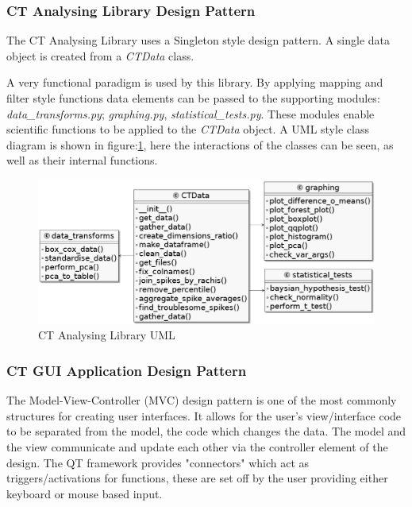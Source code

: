 \documentclass[11pt]{report}
\begin{document}
\subsubsection{CT Analysing Library Design Pattern}
\label{sec:org1d194b4}
The CT Analysing Library uses a Singleton style design pattern. A single data object is created from a \emph{CTData} class.

A very functional paradigm is used by this library. By applying mapping and filter style functions data elements can be passed to the supporting modules: \emph{data\_transforms.py}; \emph{graphing.py}, \emph{statistical\_tests.py}. These modules enable scientific functions to be applied to the \emph{CTData} object. A UML style class diagram is shown in figure:\ref{fig:orge392a34}, here the interactions of the classes can be seen, as well as their internal functions.
\begin{figure}[htbp]
\centering
\includegraphics[width=12cm]{./images/ctdata.png}
\caption{\label{fig:orge392a34}
CT Analysing Library UML}
\end{figure}

\subsubsection{CT GUI Application Design Pattern}
\label{sec:org0c42171}
The Model-View-Controller (MVC) design pattern is one of the most commonly structures for creating user interfaces. It allows for the user's view/interface code to be separated from the model, the code which changes the data. The model and the view communicate and update each other via the controller element of the design. The QT framework provides "connectors" which act as triggers/activations for functions, these are set off by the user providing either keyboard or mouse based input.
\end{document}
